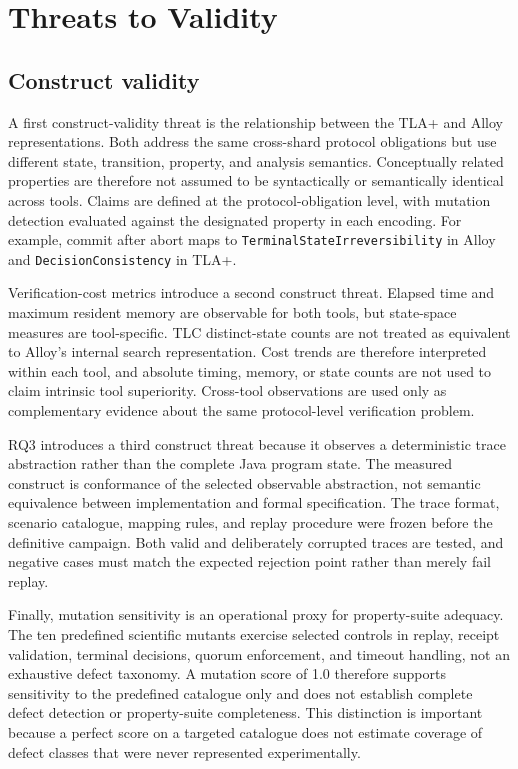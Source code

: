 \section{Threats to Validity}
\label{sec:threats-validity}

\subsection{Construct validity}
\label{subsec:construct-validity}

A first construct-validity threat is the relationship between the TLA+ and
Alloy representations. Both address the same cross-shard protocol obligations
but use different state, transition, property, and analysis semantics.
Conceptually related properties are therefore not assumed to be syntactically
or semantically identical across tools. Claims are defined at the
protocol-obligation level, with mutation detection evaluated against the
designated property in each encoding. For example, commit after abort maps to
\texttt{TerminalStateIrreversibility} in Alloy and
\texttt{DecisionConsistency} in TLA+.

Verification-cost metrics introduce a second construct threat. Elapsed time and
maximum resident memory are observable for both tools, but state-space measures
are tool-specific. TLC distinct-state counts are not treated as equivalent to
Alloy's internal search representation. Cost trends are therefore interpreted
within each tool, and absolute timing, memory, or state counts are not used to
claim intrinsic tool superiority. Cross-tool observations are used only as
complementary evidence about the same protocol-level verification problem.

RQ3 introduces a third construct threat because it observes a deterministic
trace abstraction rather than the complete Java program state. The measured
construct is conformance of the selected observable abstraction, not semantic
equivalence between implementation and formal specification. The trace format,
scenario catalogue, mapping rules, and replay procedure were frozen before the
definitive campaign. Both valid and deliberately corrupted traces are tested,
and negative cases must match the expected rejection point rather than merely
fail replay.

Finally, mutation sensitivity is an operational proxy for property-suite
adequacy. The ten predefined scientific mutants exercise selected controls in
replay, receipt validation, terminal decisions, quorum enforcement, and timeout
handling, not an exhaustive defect taxonomy. A mutation score of 1.0 therefore
supports sensitivity to the predefined catalogue only and does not establish
complete defect detection or property-suite completeness. This distinction is
important because a perfect score on a targeted catalogue does not estimate
coverage of defect classes that were never represented experimentally.

